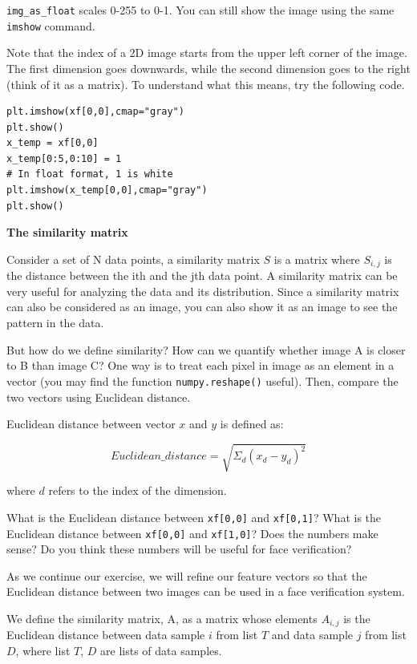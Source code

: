 \documentclass{article}
\newcounter{question}
\begin{document}
\texttt{img\_as\_float} scales 0-255 to 0-1. You can still show the image using the same \texttt{imshow} command.

Note that the index of a 2D image starts from the upper left corner of the image. The first dimension goes downwards, while the second dimension goes to the right (think of it as a matrix). To understand what this means, try the following code.

\begin{verbatim}
plt.imshow(xf[0,0],cmap="gray")
plt.show()
x_temp = xf[0,0]
x_temp[0:5,0:10] = 1
# In float format, 1 is white
plt.imshow(x_temp[0,0],cmap="gray")
plt.show()
\end{verbatim}

\textbf{The similarity matrix}

Consider a set of N data points, a similarity matrix $S$ is a matrix where $S_{i,j}$ is the distance between the ith and the jth data point. A similarity matrix can be very useful for analyzing the data and its distribution. Since a similarity matrix can also be considered as an image, you can also show it as an image to see the pattern in the data.

But how do we define similarity? How can we quantify whether image A is closer to B than image C? One way is to treat each pixel in image as an element in a vector (you may find the function \texttt{numpy.reshape()} useful). Then, compare the two vectors using Euclidean distance.

Euclidean distance between vector $x$ and $y$ is defined as:

\begin{equation}
Euclidean\_distance = \sqrt{\Sigma_d (x_d - y_d)^2}
\end{equation}

where $d$ refers to the index of the dimension.

\question What is the Euclidean distance between \texttt{xf[0,0]} and \texttt{xf[0,1]}? What is the Euclidean distance between \texttt{xf[0,0]} and \texttt{xf[1,0]}? Does the numbers make sense? Do you think these numbers will be useful for face verification?

As we continue our exercise, we will refine our feature vectors so that the Euclidean distance between two images can be used in a face verification system.

We define the similarity matrix, A, as a matrix whose elements $A_{i,j}$ is the Euclidean distance between data sample $i$ from list $T$ and data sample $j$ from list $D$, where list $T$, $D$ are lists of data samples.
\end{document}
